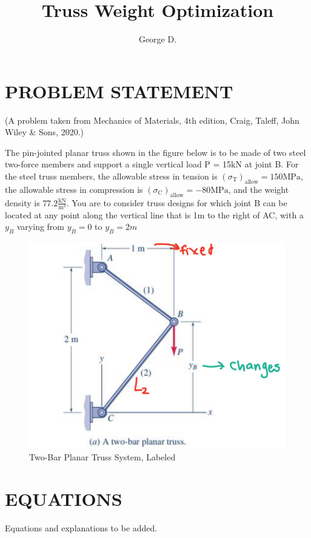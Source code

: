 \documentclass[12pt, a4paper]{article}
\begin{document}
\title{Truss Weight Optimization}
\author{George D.}
\maketitle{}

\section{PROBLEM STATEMENT}

(A problem taken from Mechanics of Materials, 4th edition, Craig, Taleff, John Wiley & Sons, 2020.) 

The pin-jointed planar truss shown in the figure below is to be made of two steel two-force members and support a single vertical load P = 15kN at joint B. For the steel truss members, the allowable stress in tension is $(\sigma_\text{T})_\text{allow}=150 \text{MPa}$, the allowable stress in compression is $(\sigma_\text{C})_\text{allow}=-80 \text{MPa}$, and the weight density is $77.2 \frac{\text{kN}}{\text{m}^3}$. You are to consider truss designs for which joint B can be located at any point along the vertical line that is 1m to the right of AC, with a $y_B$ varying from $y_B=0$ to $y_B = 2m$

\begin{figure}[H]
    \centering
    \includegraphics[width=0.5\linewidth]{problem.png}
    \caption{Two-Bar Planar Truss System, Labeled}
\end{figure}

\newpage
\section{EQUATIONS}

Equations and explanations to be added.

\end{document}
